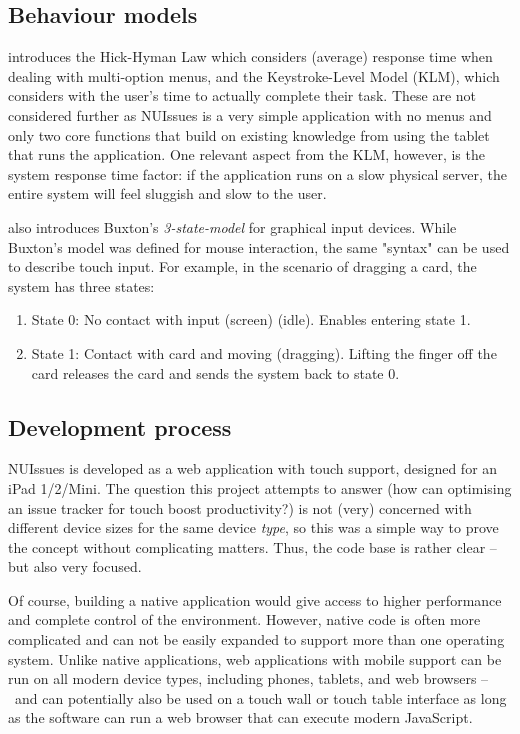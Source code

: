 \subsection{Behaviour models}

\textcite{mackenzie:motor-behaviour-models-for-human-computer-interaction:2003} introduces the Hick-Hyman Law which considers (average) response time when dealing with multi-option menus, and the Keystroke-Level Model (KLM), which considers with the user's time to actually complete their task. These are not considered further as NUIssues is a very simple application with no menus and only two core functions that build on existing knowledge from using the tablet that runs the application. One relevant aspect from the KLM, however, is the system response time factor: if the application runs on a slow physical server, the entire system will feel sluggish and slow to the user. 

\textcite[4]{mackenzie:motor-behaviour-models-for-human-computer-interaction:2003} also introduces Buxton's \textit{3-state-model} for graphical input devices. While Buxton's model was defined for mouse interaction, the same "syntax" can be used to describe touch input. For example, in the scenario of dragging a card, the system has three states:

\begin{enumerate}
  \item State 0: No contact with input (screen) (idle). Enables entering state 1.
  \item State 1: Contact with card and moving (dragging). Lifting the finger off the card releases the card and sends the system back to state 0.
\end{enumerate}

\subsection{Development process}

NUIssues is developed as a web application with touch support, designed for an iPad 1/2/Mini. The question this project attempts to answer (how can optimising an issue tracker for touch boost productivity?) is not (very) concerned with different device sizes for the same device \textit{type}, so this was a simple way to prove the concept without complicating matters. Thus, the code base is rather clear -- but also very focused.

Of course, building a native application would give access to higher performance and complete control of the environment. However, native code is often more complicated and can not be easily expanded to support more than one operating system. Unlike native applications, web applications with mobile support can be run on all modern device types, including phones, tablets, and web browsers – and can potentially also be used on a touch wall or touch table interface as long as the software can run a web browser that can execute modern JavaScript.

